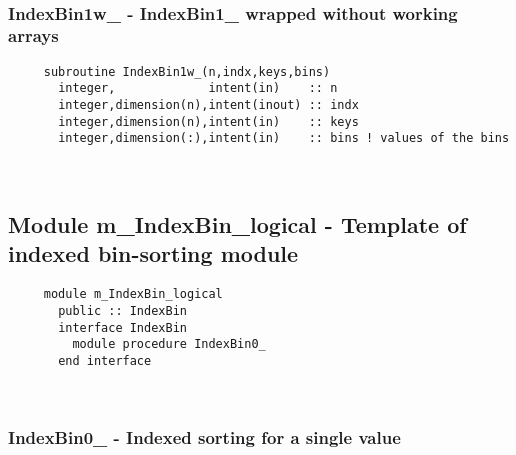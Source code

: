  
\mbox{}\hrulefill\ 
 
  \subsubsection{IndexBin1w\_ - IndexBin1\_ wrapped without working arrays}

\begin{verbatim} 
     subroutine IndexBin1w_(n,indx,keys,bins)
       integer,             intent(in)    :: n
       integer,dimension(n),intent(inout) :: indx
       integer,dimension(n),intent(in)    :: keys
       integer,dimension(:),intent(in)    :: bins ! values of the bins
 \end{verbatim} %


 
 
\mbox{}\hrulefill\ 
 
  \subsection{Module m\_IndexBin\_logical - Template of indexed bin-sorting module }

\begin{verbatim} 
     module m_IndexBin_logical
       public :: IndexBin
       interface IndexBin
         module procedure IndexBin0_
       end interface
 \end{verbatim} %
 
 
\mbox{}\hrulefill\ 
 

  \subsubsection{IndexBin0\_ - Indexed sorting for a single value}

